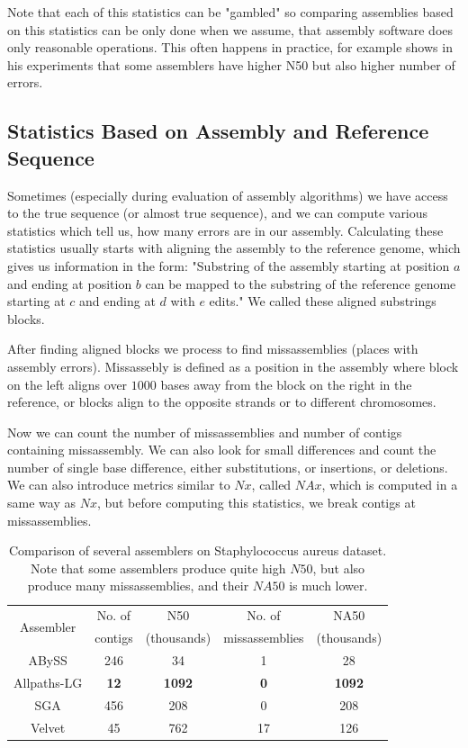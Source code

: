 Note that each of this statistics can be "gambled" so comparing assemblies based
on this statistics can be only done when we assume, that assembly software does only
reasonable operations. This often happens in practice, for example
\citet{gage} shows in his experiments that some assemblers have
higher N50 but also higher number of errors. 

\subsection{Statistics Based on Assembly and Reference Sequence}

Sometimes (especially during evaluation of assembly algorithms) we have access to 
the true sequence
(or almost true sequence), and we can compute various statistics which tell us, how many
errors are in our assembly.
Calculating these statistics usually starts with aligning the assembly to the
reference genome, which
gives us information in the form:
"Substring of the assembly starting at position $a$ and ending at position $b$ can be mapped
to the substring of the reference genome starting at $c$ and ending at $d$ with $e$ edits."
We called these aligned substrings blocks. 

After finding aligned blocks we process to find missassemblies (places with assembly errors).
Missassebly \citep{Quast} is defined as a position in the assembly where block on the left
aligns over $1000$ bases away from the block on the right in the reference,
or blocks align to the opposite strands or to different chromosomes.

Now we can count the number of missassemblies and number of contigs containing missassembly.
We can also look for small differences and count the number of single base difference, either
substitutions, or insertions, or deletions. 
We can also introduce metrics similar to $Nx$, called $NAx$, which is computed in a same way
as $Nx$, but before computing this statistics, we break contigs at missassemblies.

\begin{table}
\centering
\begin{tabular}{|c|c|c|c|c|}
\hline
\multirow{2}{*}{Assembler} & No. of  & N50        & No. of         & NA50  \\
                           & contigs & (thousands)& missassemblies & (thousands) \\\hline
ABySS & 246 & 34 & 1 & 28 \\\hline
Allpaths-LG & {\bf 12} & {\bf 1092} & {\bf 0} & {\bf 1092} \\\hline
SGA & 456 & 208 & 0 & 208 \\\hline
Velvet & 45 & 762 & 17 & 126 \\\hline
\end{tabular}
\caption{Comparison of several assemblers on Staphylococcus aureus dataset. Note that some
  assemblers produce quite high $N50$, but also produce many missassemblies, and their
$NA50$ is much lower.} 
\label{tab:gage}
\end{table}

